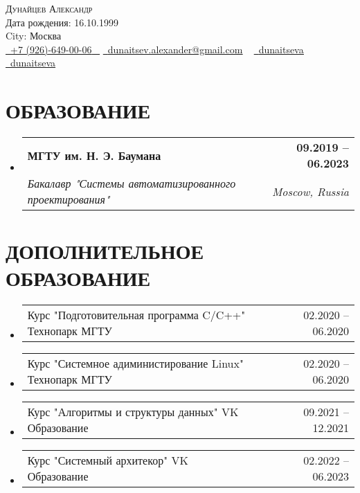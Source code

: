 \documentclass[letterpaper,11pt]{article}
\makeatletter
\newcommand{\resumeSubheading}[4]{
  \vspace{-2pt}\item
    \begin{tabular*}{1.0\textwidth}[t]{l@{\extracolsep{\fill}}r}
      \textbf{\large#1} & \textbf{\small #2} \\
      \textit{\large#3} & \textit{\small #4} \\
      
    \end{tabular*}\vspace{-7pt}
}
\newcommand{\resumeSubheadingAdditional}[2]{
	\vspace{-2pt}\item
	\begin{tabular*}{1.0\textwidth}[t]{l@{\extracolsep{\fill}}r}
		\large#1 & \small #2 \\
		
	\end{tabular*}\vspace{-7pt}
}
\newcommand{\resumeSubHeadingListStart}{\begin{itemize}[leftmargin=0.0in, label={}]}
\newcommand{\resumeSubHeadingListEnd}{\end{itemize}}
\makeatother
\begin{document}


\begin{center}
    {\Huge \scshape Дунайцев Александр} \\ \vspace{1pt}
    Дата рождения: 16.10.1999 \\  City: Москва \\ \vspace{1pt}
    \small \href{tel:+79266490006}{ \raisebox{-0.1\height}\faPhone\ \underline{+7 (926)-649-00-06} ~} \href{dunaitsev.alexander@gmail.com}{\raisebox{-0.2\height}\faEnvelope\  \underline{dunaitsev.alexander@gmail.com}} ~ 
    \href{https://github.com/dunaitseva}{\raisebox{-0.2\height}\faGithub\ \underline{dunaitseva}} ~
    \href{https://t.me/dunaitseva}{\raisebox{-0.2\height}\faTelegram\ \underline{dunaitseva}} ~
    \vspace{-8pt}
\end{center}


\section{ОБРАЗОВАНИЕ}
  \resumeSubHeadingListStart
  \resumeSubheading
  {МГТУ им. Н. Э. Баумана}{09.2019 -- 06.2023}
  {Бакалавр "Системы автоматизированного проектирования"}{Moscow, Russia}
  \resumeSubHeadingListEnd

\section{ДОПОЛНИТЕЛЬНОЕ ОБРАЗОВАНИЕ}
\resumeSubHeadingListStart
\resumeSubheadingAdditional
{Курс "Подготовительная программа C/C++" Технопарк МГТУ}{02.2020 -- 06.2020}
\resumeSubHeadingListEnd

\resumeSubHeadingListStart
\resumeSubheadingAdditional
{Курс "Системное адиминистирование Linux" Технопарк МГТУ}{02.2020 -- 06.2020}
\resumeSubHeadingListEnd

\resumeSubHeadingListStart
\resumeSubheadingAdditional
{Курс "Алгоритмы и структуры данных" VK Образование}{09.2021 -- 12.2021}
\resumeSubHeadingListEnd

\resumeSubHeadingListStart
\resumeSubheadingAdditional
{Курс "Системный архитекор" VK Образование}{02.2022 -- 06.2023}
\resumeSubHeadingListEnd
\end{document}
